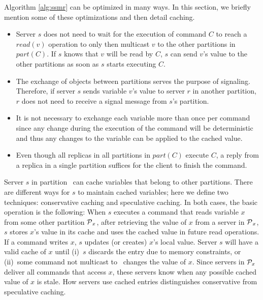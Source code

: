 Algorithm \ref{alg:ssmr} can be optimized in many ways. 
In this section, we briefly mention some of these optimizations and then detail caching.
\begin{itemize}
\item Server $s$ does not need to wait for the execution of command $C$ to reach a $read(v)$ operation to only then multicast $v$ to the other partitions in $part(C)$. If $s$ knows that $v$ will be read by $C$, $s$ can send $v$'s value to the other partitions as soon as $s$ starts executing $C$.
\item The exchange of objects between partitions serves the purpose of signaling. Therefore, if server $s$ sends variable $v$'s value to server $r$ in another partition, $r$ does not need to receive a signal message from $s$'s partition.
\item It is not necessary to exchange each variable more than once per command since any change during the execution of the command will be deterministic and thus any changes to the variable can be applied to the cached value.
\item Even though all replicas in all partitions in $part(C)$ execute $C$, a reply from a replica in a single partition suffices for the client to finish the command.
\end{itemize}

Server $s$ in partition \pp\ can cache variables that belong to other partitions. 
There are different ways for $s$ to maintain cached variables; here we define two techniques: conservative caching and speculative caching. 
In both cases, the basic operation is the following: 
When $s$ executes a command that reads variable $x$ from some other partition $\mathcal{P}{}_x$, after retrieving the value of $x$ from a server in $\mathcal{P}{}_x$, $s$ stores $x$'s value in its cache and uses the cached value in future read operations.
If a command writes $x$, $s$ updates (or creates) $x$'s local value. 
Server $s$ will have a valid cache of $x$ until (i)~$s$ discards the entry due to memory constraints, or (ii)~some command not multicast to \pp\ changes the value of $x$. 
Since servers in $\mathcal{P}_x$ deliver all commands that access $x$, these servers know when any possible cached value of $x$ is stale.
How servers use cached entries distinguishes conservative from speculative caching.



